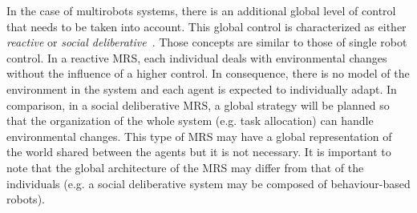 

  In the case of multirobots systems, there is an additional global level of control that needs to be taken into account. This global control is characterized as either \emph{reactive} or \emph{social deliberative}~\parencite{Iocchi2001, Carpin2001}. Those concepts are similar to those of single robot control. In a reactive MRS, each individual deals with environmental changes without the influence of a higher control. In consequence, there is no model of the environment in the system and each agent is expected to individually adapt. In comparison, in a social deliberative MRS, a global strategy will be planned so that the organization of the whole system (e.g. task allocation) can handle environmental changes. This type of MRS may have a global representation of the world shared between the agents but it is not necessary. It is important to note that the global architecture of the MRS may differ from that of the individuals (e.g. a social deliberative system may be composed of behaviour-based robots).

